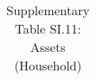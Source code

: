 \begin{longtable}{llcccccccccc}
\caption{Supplementary Table SI.11: Assets (Household)} \label{tab:pap__b5} \\                                                                                                                                                                                                                                                                                                                                                                                                                                                                                                                                                                                                                                                                                                                                                                                                            
\hline \hline                                                                                                                                                                                                                                                                                                                                                                                                                                                                                                                                                                                                                                                                                                                                                                                                                                                                             

\end{longtable}

